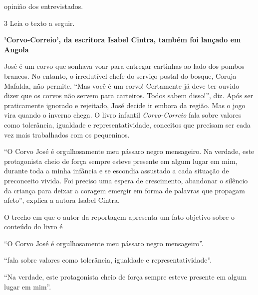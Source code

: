 \begin{conteudo}
\begin{conteudo}
\begin{conteudo}
\begin{conteudo}
\begin{conteudo}
\begin{escolha}
\item opinião dos entrevistados.
\end{escolha}

\pagebreak
\num{3} Leia o texto a seguir.

\begin{myquote}
\textbf{'Corvo-Correio', da escritora Isabel Cintra, também foi lançado 
em Angola}

José é um corvo que sonhava voar para entregar cartinhas ao lado dos
pombos brancos. No entanto, o irredutível chefe do serviço postal do
bosque, Coruja Mafalda, não permite. ``Mas você é um corvo! Certamente já
deve ter ouvido dizer que os corvos não servem para carteiros. Todos
sabem disso!'', diz. Após ser praticamente ignorado e rejeitado, José
decide ir embora da região. Mas o jogo vira quando o inverno chega. O
livro infantil \textit{Corvo-Correio} fala sobre valores como tolerância,
igualdade e representatividade, conceitos que precisam ser cada vez mais
trabalhados com os pequeninos.

``O Corvo José é orgulhosamente meu pássaro negro mensageiro. Na
verdade, este protagonista cheio de força sempre esteve presente em
algum lugar em mim, durante toda a minha infância e se escondia
assustado a cada situação de preconceito vivida. Foi preciso uma espera
de crescimento, abandonar o silêncio da criança para deixar a coragem
emergir em forma de palavras que propagam afeto'', explica a autora
Isabel Cintra.

\end{myquote}

O trecho em que o autor da reportagem apresenta um fato objetivo sobre
o conteúdo do livro é

\begin{escolha}
\item ``O Corvo José é orgulhosamente meu pássaro negro mensageiro''.

\item ``fala sobre
valores como tolerância, igualdade e representatividade''.

\item ``Na verdade, este protagonista cheio de força sempre esteve
presente em algum lugar em mim''.


\end{escolha}
\end{conteudo}
\end{conteudo}
\end{conteudo}
\end{conteudo}
\end{conteudo}
